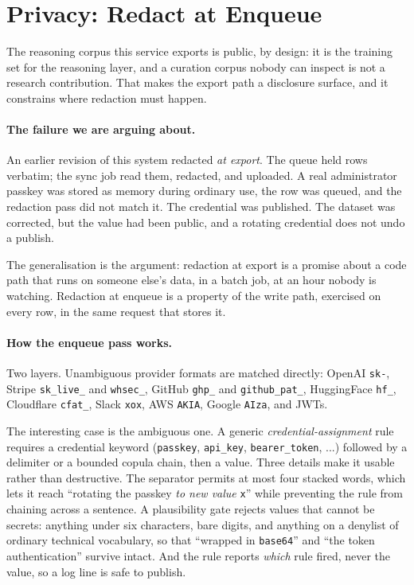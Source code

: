 \documentclass[10pt,twocolumn]{article}
\begin{document}
\section{Privacy: Redact at Enqueue}
\label{sec:privacy}

The reasoning corpus this service exports is public, by design: it is the
training set for the reasoning layer, and a curation corpus nobody can inspect
is not a research contribution. That makes the export path a disclosure surface,
and it constrains where redaction must happen.

\paragraph{The failure we are arguing about.}
An earlier revision of this system redacted \emph{at export}. The queue held
rows verbatim; the sync job read them, redacted, and uploaded. A real
administrator passkey was stored as memory during ordinary use, the row was
queued, and the redaction pass did not match it. The credential was published.
The dataset was corrected, but the value had been public, and a rotating
credential does not undo a publish.

The generalisation is the argument: redaction at export is a promise about a
code path that runs on someone else's data, in a batch job, at an hour nobody
is watching. Redaction at enqueue is a property of the write path, exercised on
every row, in the same request that stores it.

\paragraph{How the enqueue pass works.}
Two layers. Unambiguous provider formats are matched directly: OpenAI
\texttt{sk-}, Stripe \texttt{sk\_live\_} and \texttt{whsec\_}, GitHub
\texttt{ghp\_} and \texttt{github\_pat\_}, HuggingFace \texttt{hf\_},
Cloudflare \texttt{cfat\_}, Slack \texttt{xox}, AWS \texttt{AKIA}, Google
\texttt{AIza}, and JWTs.

The interesting case is the ambiguous one. A generic
\emph{credential-assignment} rule requires a credential keyword
(\texttt{passkey}, \texttt{api\_key}, \texttt{bearer\_token}, ...) followed by a
delimiter or a bounded copula chain, then a value. Three details make it usable
rather than destructive. The separator permits at most four stacked words,
which lets it reach ``rotating the passkey \emph{to new value} \texttt{x}'' while
preventing the rule from chaining across a sentence. A plausibility gate rejects
values that cannot be secrets: anything under six characters, bare digits, and
anything on a denylist of ordinary technical vocabulary, so that ``wrapped in
\texttt{base64}'' and ``the token authentication'' survive intact. And the rule
reports \emph{which} rule fired, never the value, so a log line is safe to
publish.
\end{document}
